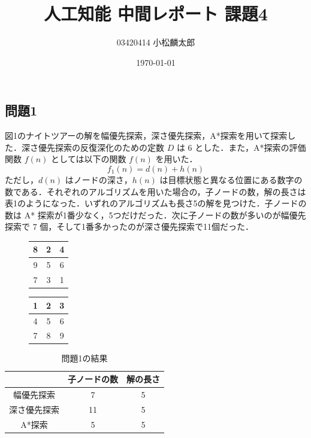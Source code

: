 \documentclass[a4paper, twocolumn]{ltjsarticle}
\title{人工知能 中間レポート 課題4}
\author{03420414  小松麟太郎}
\date{\today}
\begin{document}
\maketitle

\subsection*{問題1}
図1のナイトツアーの解を幅優先探索，深さ優先探索，A*探索を用いて探索した．深さ優先探索の反復深化のための定数 $D$ は 6 とした．また，A*探索の評価関数 $f(n)$ としては以下の関数 $f(n)$ を用いた．
\begin{equation}
    f_1(n) = d(n) + h(n)
\end{equation}
ただし，$d(n)$ はノードの深さ，$h(n)$ は目標状態と異なる位置にある数字の数である．それぞれのアルゴリズムを用いた場合の，子ノードの数，解の長さは表1のようになった．いずれのアルゴリズムも長さ5の解を見つけた．子ノードの数は A* 探索が1番少なく，5つだけだった．次に子ノードの数が多いのが幅優先探索で 7 個，そして1番多かったのが深さ優先探索で11個だった．
\begin{figure}[ht]
    \centering
    \begin{minipage}{0.45\linewidth}
        \flushright
        \begin{tabular}{|c|c|c|}
            \hline
            8 & 2 & 4 \\ \hline
            9 & 5 & 6 \\ \hline
            7 & 3 & 1 \\ \hline
        \end{tabular}

    \end{minipage}
    \hfill
    \begin{minipage}{0.45\linewidth}
        \flushleft
        \begin{tabular}{|c|c|c|}
            \hline
            1 & 2 & 3 \\ \hline
            4 & 5 & 6 \\ \hline
            7 & 8 & 9 \\ \hline
        \end{tabular}

    \end{minipage}
    \caption{}
\end{figure}
\begin{table}[h]
    \centering
    \begin{tabular}{@{}c|cc@{}}
        \hline
        & 子ノードの数 & 解の長さ\\
        \hline
        幅優先探索 & 7 & 5 \\ 
        深さ優先探索 & 11 & 5 \\ 
        A*探索 & 5 & 5 \\ 
        \hline
    \end{tabular}
    \caption{問題1の結果}
\end{table}
\end{document}

